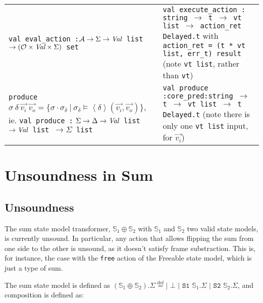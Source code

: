 \documentclass[,a4paper,oneside]{article}
\newcommand{\code}[1]{\texttt{#1}}
\newcommand{\defeq}[0]{\stackrel{\text{def}}=}
\newcommand{\mmdl}[0]{\ensuremath{\mathbb S}}
\newcommand{\rarr}[0]{\ensuremath{\rightarrow}}
\begin{document}
\begin{tabularx}{\textwidth}{X|X}
	\thead{\bfseries Theory} & \thead{\bfseries Gillian} \\ \hline\hline
\code{val eval\_action :\newline ${\cal A}\rarr\Sigma\rarr \textrm{\it Val}$ list $\rarr ({\cal O}\times \textrm{\it Val} \times \Sigma)$ set}
	& \small\code{val execute\_action :\newline
    string $\rarr$ t $\rarr$ vt list $\rarr$ action\_ret Delayed.t}
    with \code{action\_ret = (t * vt list, err\_t) result} (note \code{vt list}, rather than \code{vt})
    \\\hline
    \code{produce }$\sigma ~\delta ~\vec{v_i}~\vec{v_o} = \{ \sigma\cdot\sigma_\delta ~|~\sigma_\delta \vDash \left<\delta\right> (\vec{v_i}, \vec{v_o}) \}$, ie.\newline
    \small\code{val produce :}\newline
    \code{$\Sigma\rarr\Delta \rarr \textrm{\it Val}$ list $\rarr \textrm{\it Val}$ list $\rarr \Sigma$ list}
    & \small\code{val produce :\newline core\_pred:string $\rarr$ t $\rarr$ vt list $\rarr$ t Delayed.t} (note there is only one \code{vt list} input, for $\vec{v_i}$)
    
\end{tabularx}

\clearpage

\section{Unsoundness in Sum}

\subsection{Unsoundness}

\newcommand{\sone}[0]{\code{S1}~}
\newcommand{\stwo}[0]{\code{S2}~}

The sum state model transformer, $\mmdl_1 \oplus \mmdl_2$ with $\mmdl_1$ and $\mmdl_2$ two valid state models, is currently unsound. In particular, any action that allows flipping the sum from one side to the other is unsound, as it doesn't satisfy frame substraction. This is, for instance, the case with the \code{free} action of the Freeable state model, which is just a type of sum.

The sum state model is defined as $(\mmdl_1 \oplus \mmdl_2).\Sigma \defeq \code{| }\bot \code{ | S1 } \mmdl_1.\Sigma \code{ | S2 } \mmdl_2.\Sigma$, and composition is defined as:
\end{document}

